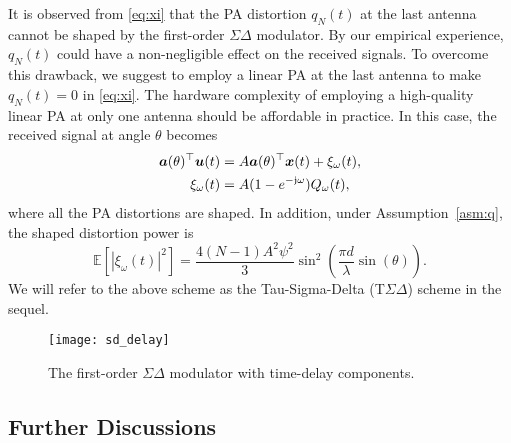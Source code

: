 \documentclass[10pt,twocolumn,twoside]{IEEEtran}
\begin{document}
It is observed from \eqref{eq:xi} that the PA distortion $q_N(t)$ at the last antenna cannot be shaped by the first-order $\Sigma \Delta$ modulator.
By our empirical experience, $q_N(t)$ could have a non-negligible effect on the received signals.
To overcome this drawback, we suggest to employ a linear PA at the last antenna to make $q_N(t)=0$ in \eqref{eq:xi}.
The hardware complexity of employing a high-quality linear PA  at only one antenna should be affordable in practice.
In this case, the received signal at angle $\theta$ becomes
\begin{equation}\label{eq:receive_sig_sd}
\begin{aligned}
{\bm a}(\theta)^\top {\bm u}(t) &= A{\bm a}(\theta)^\top {\bm x}(t) + \xi_\omega(t), \\
\xi_\omega(t) &= A(1 - e^{-{\mathfrak j} \omega})  Q_\omega(t),
\end{aligned}
\end{equation}
where all the PA distortions are shaped.
In addition, under Assumption~\ref{asm:q}, the shaped distortion power is
\[
\mathbb{E}[|\xi_\omega(t)|^2] \!= \!
\frac{4(N-1)A^2\psi^2}{3}   \sin^2 \left( \frac{\pi d}{\lambda} \sin(\theta)\right).
\]
We will refer to the above scheme as the Tau-Sigma-Delta (T$ \Sigma \Delta$) scheme in the sequel.


\begin{figure}[t]
	\centering
	\texttt{[image: sd\_delay]}
	\caption{ The first-order ${\Sigma \Delta}$ modulator with time-delay components.}
	\label{fig:sd_delay}
\end{figure}







\subsection{Further Discussions}
\end{document}
